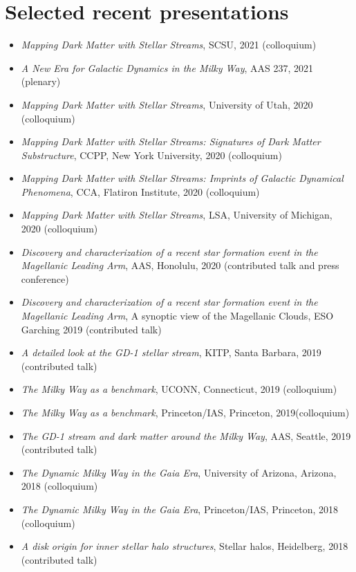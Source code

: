 \documentclass[12pt, letterpaper]{apw-cv}
\begin{document}
\section*{Selected recent presentations}

\begin{itemize}
    \item \emph{Mapping Dark Matter with Stellar Streams}, SCSU, 2021 (colloquium)
    \item \emph{A New Era for Galactic Dynamics in the Milky Way}, AAS 237, 2021 (plenary)
    \item \emph{Mapping Dark Matter with Stellar Streams}, University of Utah, 2020 (colloquium)
    \item \emph{Mapping Dark Matter with Stellar Streams: Signatures of Dark Matter Substructure}, CCPP, New York University, 2020 (colloquium)
    \item \emph{Mapping Dark Matter with Stellar Streams: Imprints of Galactic Dynamical Phenomena}, CCA, Flatiron Institute, 2020 (colloquium)
    \item \emph{Mapping Dark Matter with Stellar Streams}, LSA, University of Michigan, 2020 (colloquium)
    \item \emph{Discovery and characterization of a recent star formation event in the Magellanic Leading Arm}, AAS, Honolulu, 2020 (contributed talk and press conference)
    \item \emph{Discovery and characterization of a recent star formation event in the Magellanic Leading Arm}, A synoptic view of the Magellanic Clouds, ESO Garching 2019 (contributed talk)
    \item \emph{A detailed look at the GD-1 stellar stream}, KITP, Santa Barbara, 2019 (contributed talk)
    \item \emph{The Milky Way as a benchmark}, UCONN, Connecticut, 2019 (colloquium)
    \item \emph{The Milky Way as a benchmark}, Princeton/IAS, Princeton, 2019(colloquium)
    \item \emph{The GD-1 stream and dark matter around the Milky Way}, AAS, Seattle, 2019 (contributed talk)
    \item \emph{The Dynamic Milky Way in the Gaia Era}, University of Arizona, Arizona, 2018 (colloquium)
    \item \emph{The Dynamic Milky Way in the Gaia Era}, Princeton/IAS, Princeton, 2018 (colloquium)
    \item \emph{A disk origin for inner stellar halo structures}, Stellar halos, Heidelberg, 2018 (contributed talk)

\end{itemize}
\end{document}
